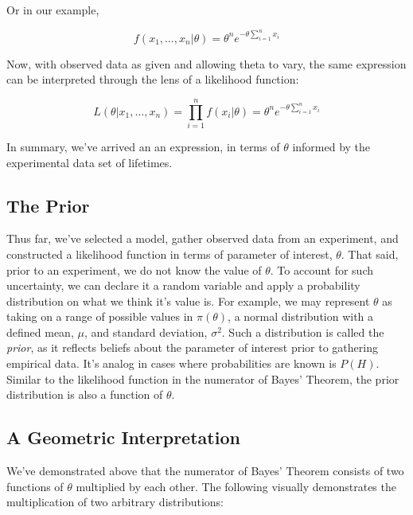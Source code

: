 \documentclass[12pt]{article}
\begin{document}
\noindent Or in our example,

\begin{equation}
f(x_1, \ldots, x_n|\theta) = \theta^n e^{-\theta \sum_{i=1}^n x_i}
\end{equation}

\noindent Now, with observed data as given and allowing theta to vary, the same expression can be interpreted through the lens of a likelihood function:

\begin{equation}
L(\theta | x_1, \ldots, x_n) = \prod_{i=1}^n f(x_i|\theta) = \theta^n e^{-\theta \sum_{i=1}^n x_i}
\end{equation}

\noindent In summary, we've arrived an an expression, in terms of $\theta$ informed by the experimental data set of lifetimes.

\subsection*{The Prior}
\noindent Thus far, we've selected a model, gather observed data from an experiment, and constructed a likelihood function in terms of parameter of interest, $\theta$. That said, prior to an experiment, we do not know the value of $\theta$. To account for such uncertainty, we can declare it a random variable and apply a probability distribution on what we think it's value is. For example, we may represent $\theta$ as taking on a range of possible values in $\pi(\theta)$, a normal distribution with a defined mean, $\mu$, and standard deviation, $\sigma^2$. Such a distribution is called the \textit{prior}, as it reflects beliefs about the parameter of interest prior to gathering empirical data. It's analog in cases where probabilities are known is $P(H)$. Similar to the likelihood function in the numerator of Bayes' Theorem, the prior distribution is also a function of $\theta$.

\newpage
\subsection*{A Geometric Interpretation}
\noindent We've demonstrated above that the numerator of Bayes' Theorem consists of two functions of $\theta$ multiplied by each other. The following visually demonstrates the multiplication of two arbitrary distributions:
\end{document}
